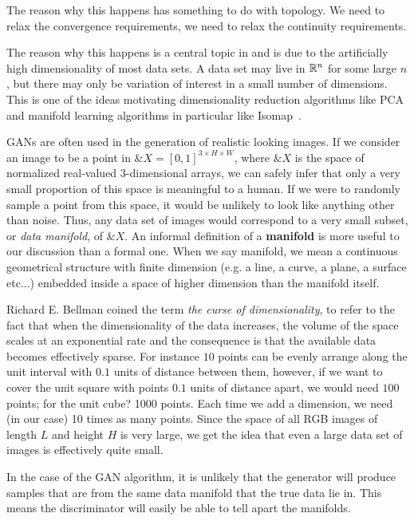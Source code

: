 The reason why this happens has something to do with topology. We need
to relax the convergence requirements, we need to relax the continuity
requirements.

The reason why this happens is a central topic in
\cite{ref:arjovsky-towards-2017} and is due to the artificially high
dimensionality of most data sets. A data set may live in $\mathbb{R}^n$ for
some large $n$, but there may only be variation of interest in a small
number of dimensions. This is one of the ideas motivating
dimensionality reduction algorithms like PCA and manifold learning
algorithms in particular like Isomap~\cite{ref:tenenbaum-2000}.

GANs are often used in the generation of realistic looking images. If
we consider an image to be a point in $\&X = [0, 1]^{3 \times H \times
  W}$, where $\&X$ is the space of normalized real-valued 3-dimensional
arrays, we can safely infer that only a very small proportion of this
space is meaningful to a human.  If we were to randomly sample a point
from this space, it would be unlikely to look like anything other than
noise. Thus, any data set of images would correspond to a very small
subset, or \textit{data manifold}, of $\&X$. An informal definition of
a \textbf{manifold} is more useful to our discussion than a formal
one. When we say manifold, we mean a continuous geometrical structure
with finite dimension (e.g. a line, a curve, a plane, a surface
etc...) embedded inside a space of higher dimension than the manifold
itself.

Richard E. Bellman coined the term \textit{the curse of
  dimensionality}, to refer to the fact that when the dimensionality of
the data increases, the volume of the space scales at an exponential
rate and the consequence is that the available data becomes
effectively sparse. For instance $10$ points can be evenly arrange
along the unit interval with $0.1$ units of distance between them,
however, if we want to cover the unit square with points $0.1$ units
of distance apart, we would need $100$ points; for the unit cube? 1000
points. Each time we add a dimension, we need (in our case) 10 times
as many points. Since the space of all RGB images of length $L$ and
height $H$ is very large, we get the idea that even a large data set
of images is effectively quite small.

In the case of the GAN algorithm, it is unlikely that the generator
will produce samples that are from the same data manifold that the
true data lie in. This means the discriminator will easily be able to
tell apart the manifolds.  %


